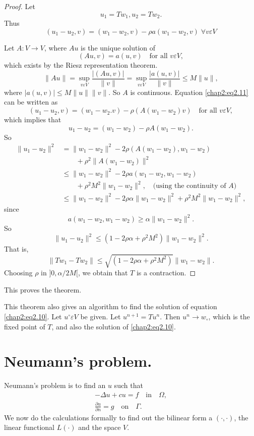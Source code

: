\begin{proof}
Let
$$
u_1=Tw_1, u_2=Tw_2.
$$
Thus
\begin{equation}\label{chap2:eq2.11}
(u_1-u_2, v)=(w_1-w_2, v)-\rho a(w_1-w_2, v) \; \forall  v \varepsilon V
\end{equation}

Let $A:V\to V$, where $Au$ is the unique solution of 
$$
(Au, v)=a(u, v) \quad \text{for all }  v \varepsilon V,
$$
which exists by the Riesz representation theorem.
$$
\parallel Au\parallel = \sup\limits_{v\varepsilon V}\frac{|(Au,
v)|}{\parallel v\parallel} = \sup\limits_{v\varepsilon V}\frac{|a(u,
v)|}{\parallel v\parallel}\leq M\parallel u\parallel,
$$
where $|a(u, v)|\leq M\parallel u\parallel \parallel v\parallel$. So
$A$ is continuous. Equation \eqref{chap2:eq2.11} can be written as 
$$
(u_1-u_2, v)=(w_1-w_2. v)-\rho(A(w_1-w_2)v)\quad\text{for all }
v\varepsilon V,
$$
which implies that 
$$
u_1-u_2=(w_1-w_2)-\rho A(w_1-w_2).
$$
So
\begin{align*}
\parallel u_1-u_2\parallel^2&=\parallel w_1-w_2\parallel^2-2\rho(A
(w_1-w_2), w_1-w_2)\\
&\qquad+\rho^2\parallel A(w_1-w_2)\parallel^2\\
&\leq\parallel w_1-w_2\parallel^2 -2\rho a(w_1-w_2, w_1-w_2)\\
&\qquad +\rho^2M^2\parallel w_1-w_2\parallel^2, \quad \text{(using the
  continuity of $A$)}\\ 
&\leq\parallel w_1-w_2\parallel^2 -2\rho\alpha\parallel
w_1-w_2\parallel^2 +\rho^2M^2\parallel w_1-w_2\parallel^2,
\end{align*}
since\pageoriginale
$$
a(w_1-w_2, w_1-w_2)\geq\alpha\parallel w_1-w_2\parallel^2.
$$
So
$$
\parallel u_1-u_2\parallel^2\leq(1-2\rho\alpha +\rho^2M^2)\parallel
w_1-w_2\parallel^2.
$$
That is, 
$$
\parallel Tw_1-Tw_2\parallel \leq \sqrt{(1-2\rho\alpha
+\rho^2 M^2)}\parallel w_1-w_2\parallel.
$$
Choosing $\rho$ in $]0, \alpha/2M[$, we obtain that $T$ is a
contraction. 
\end{proof}

This proves the theorem. 

\setcounter{REM}{0}
\begin{REM}\label{chap2:rem1}
This theorem also gives an algorithm to find the solution of equation
\eqref{chap2:eq2.10}. Let $u^\circ \varepsilon V$ be given. Let
$u^{n+1}=Tu^n$. Then $u^n\to w_\circ$, which is the fixed point of $T$,
and also the solution of \eqref{chap2:eq2.10}.
\end{REM}

\section{Neumann's problem.}\label{chap2:ssec2.3}
Neumann's problem is to find an $u$ such that 
\begin{align}\label{chap2:eq2.12}
-\Delta u+cu=f \quad\text{in}\quad\Omega,\\
\frac{\partial u}{\partial n}=g\quad\text{on}\quad \Gamma.\label{chap2:eq2.13}
\end{align}
We now do the calculations formally to find out the bilinear form a
$(\cdot,\cdot)$, the linear functional $L(\cdot)$ and the space $V$. 

